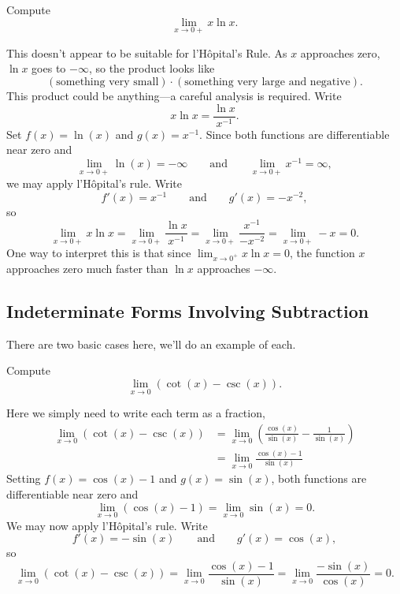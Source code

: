\begin{example}\label{example:xlnx infty} 
Compute 
\[
\lim_{x\to 0+} x\ln x.
\]
\end{example}

\begin{solution}
This doesn't appear to be suitable for l'H\^opital's Rule. As $x$
approaches zero, $\ln x$ goes to $-\infty$, so the product looks like
\[
(\text{something very small})\cdot (\text{something very large and
  negative}).
\] 
This product could be anything---a careful analysis is required.
Write
\[
x\ln x = \frac{\ln x}{x^{-1}}.
\]
Set $f(x) = \ln(x)$ and $g(x) = x^{-1}$.  Since both functions are differentiable near zero and 
\[
\lim_{x\to 0+} \ln(x) = -\infty\qquad\text{and}\qquad \lim_{x\to 0+} x^{-1} = \infty,
\]
we may apply l'H\^opital's rule. Write
\[
f'(x) = x^{-1}\qquad \text{and}\qquad g'(x) = -x^{-2},
\]
so
\[
\lim_{x\to 0+} x\ln x = \lim_{x\to 0+} \frac{\ln x}{x^{-1}} = \lim_{x\to 0+} \frac{x^{-1}}{-x^{-2}} =\lim_{x\to 0+} -x = 0.
\]
One way to interpret this is that since $\lim_{x\to 0^+}x\ln x = 0$,
the function $x$ approaches zero much faster than $\ln x$ approaches
$-\infty$.
\end{solution}

\subsection*{Indeterminate Forms Involving Subtraction}

There are two basic cases here, we'll do an example of each.

\begin{example}[$\pmb\infty$--$\pmb\infty$]
Compute
\[
\lim_{x\to 0} \left(\cot(x) - \csc(x)\right).
\]
\end{example}

\begin{solution}
Here we simply need to write each term as a fraction,
\begin{align*}
\lim_{x\to 0} \left(\cot(x) - \csc(x)\right) &= \lim_{x\to 0} \left(\frac{\cos(x)}{\sin(x)} - \frac{1}{\sin(x)}\right)\\
&= \lim_{x\to 0} \frac{\cos(x)-1}{\sin(x)} 
\end{align*}
Setting $f(x) = \cos(x)-1$ and $g(x)=\sin(x)$, both functions are differentiable near zero and 
\[
\lim_{x\to 0}(\cos(x)-1)=\lim_{x\to 0}\sin(x) = 0.
\]
We may now apply l'H\^opital's rule. Write
\[
f'(x) = -\sin(x)\qquad \text{and}\qquad g'(x) = \cos(x),
\]
so
\[
\lim_{x\to 0} \left(\cot(x) - \csc(x)\right) = \lim_{x\to 0} \frac{\cos(x)-1}{\sin(x)} = \lim_{x\to 0} \frac{-\sin(x)}{\cos(x)} =0.
\]
\end{solution}


